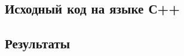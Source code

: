 \documentclass{article}
\begin{document}
	\subsection{Исходный код на языке С++}
		
		
		
		
	\newpage
	
	\subsection{Результаты}
\end{document}
